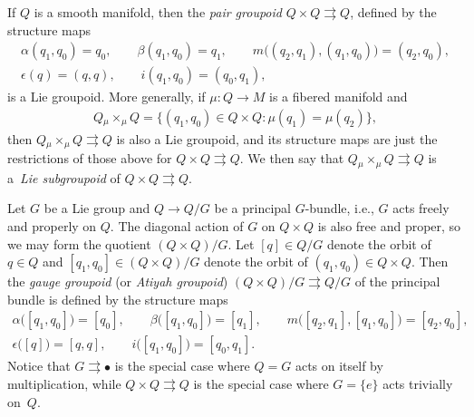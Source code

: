 \documentclass[pdftex]{sigma}
\numberwithin{equation}{section}
\begin{document}
\begin{Example} \label{ex:pairGroupoid} If $Q$ is a smooth manifold, then the \emph{pair groupoid} $ Q \times Q \rightrightarrows Q $, def\/ined by the structure maps
 \begin{gather*}
 \alpha ( q _1 , q _0 ) = q _0 , \qquad \beta ( q _1 , q _0 ) = q _1 , \qquad m \bigl( ( q _2 , q _1 ) , ( q _1 , q _0 ) \bigr) = ( q _2 , q _0 ) ,\\
 \epsilon (q) = ( q, q ) , \qquad i ( q _1 , q _0 ) = ( q _0, q _1 ) ,
 \end{gather*}
 is a Lie groupoid. More generally, if $ \mu \colon Q \rightarrow M $ is a f\/ibered manifold and
 \begin{gather*}
 Q \mathbin{ _\mu \times _\mu } Q = \bigl\{ ( q _1, q _0 ) \in Q \times Q\colon \mu ( q _1 ) = \mu ( q _2 ) \bigr\},
 \end{gather*}
 then $ Q \mathbin{ _\mu \times _\mu } Q \rightrightarrows Q $ is also a Lie groupoid, and its structure maps are just the restrictions of those above for $ Q \times Q \rightrightarrows Q $. We then say that $ Q \mathbin{ _\mu \times _\mu } Q \rightrightarrows Q $ is a~\emph{Lie subgroupoid} of $ Q \times Q \rightrightarrows Q $.
\end{Example}

\begin{Example} \label{ex:gaugeGroupoid} Let $G$ be a Lie group and $ Q \rightarrow Q / G $ be a principal $G$-bundle, i.e., $G$ acts freely and properly on $Q$. The diagonal action of $G$ on $ Q \times Q $ is also free and proper, so we may form the quotient $ ( Q \times Q ) / G $. Let $ [ q ] \in Q / G $
 denote the orbit of $ q \in Q $ and $ [ q _1 , q _0 ] \in ( Q \times Q ) / G $ denote the orbit of $ ( q _1 , q _0 ) \in Q \times Q $. Then the \emph{gauge groupoid} (or \emph{Atiyah groupoid}) $ ( Q \times Q ) / G \rightrightarrows Q / G $ of the principal bundle is def\/ined by the structure maps
 \begin{gather*}
 \alpha \bigl( [ q _1 , q _0 ] \bigr) = [q _0] , \qquad \beta \bigl( [ q _1, q _0 ] \bigr) = [q _1] , \qquad m \bigl( [q _2 , q
 _1 ] , [ q _1 , q _0 ] \bigr) = [ q _2 , q _0 ] ,\\
 \epsilon \bigl( [q] \bigr) = [ q, q ] , \qquad i \bigl( [ q _1 , q _0] \bigr) = [q _0, q _1].
 \end{gather*}
 Notice that $ G \rightrightarrows \bullet $ is the special case where $ Q = G $ acts on itself by multiplication, while $ Q \times Q \rightrightarrows Q $ is the special case where $ G = \{ e \} $ acts trivially on~$Q$.
\end{Example}
\end{document}
